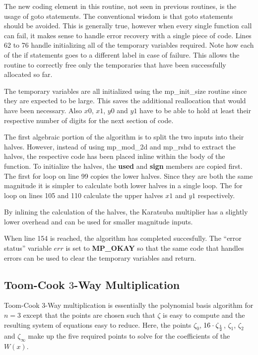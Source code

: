 \documentclass[b5paper]{book}
\begin{document}
The new coding element in this routine, not  seen in previous routines, is the usage of goto statements.  The conventional
wisdom is that goto statements should be avoided.  This is generally true, however when every single function call can fail, it makes sense
to handle error recovery with a single piece of code.  Lines 62 to 76 handle initializing all of the temporary variables 
required.  Note how each of the if statements goes to a different label in case of failure.  This allows the routine to correctly free only
the temporaries that have been successfully allocated so far.

The temporary variables are all initialized using the mp\_init\_size routine since they are expected to be large.  This saves the 
additional reallocation that would have been necessary.  Also $x0$, $x1$, $y0$ and $y1$ have to be able to hold at least their respective
number of digits for the next section of code.

The first algebraic portion of the algorithm is to split the two inputs into their halves.  However, instead of using mp\_mod\_2d and mp\_rshd
to extract the halves, the respective code has been placed inline within the body of the function.  To initialize the halves, the \textbf{used} and 
\textbf{sign} members are copied first.  The first for loop on line 99 copies the lower halves.  Since they are both the same magnitude it 
is simpler to calculate both lower halves in a single loop.  The for loop on lines 105 and 110 calculate the upper halves $x1$ and 
$y1$ respectively.

By inlining the calculation of the halves, the Karatsuba multiplier has a slightly lower overhead and can be used for smaller magnitude inputs.

When line 154 is reached, the algorithm has completed succesfully.  The ``error status'' variable $err$ is set to \textbf{MP\_OKAY} so that
the same code that handles errors can be used to clear the temporary variables and return.  

\subsection{Toom-Cook $3$-Way Multiplication}
Toom-Cook $3$-Way \cite{TOOM} multiplication is essentially the polynomial basis algorithm for $n = 3$ except that the points  are 
chosen such that $\zeta$ is easy to compute and the resulting system of equations easy to reduce.  Here, the points $\zeta_{0}$, 
$16 \cdot \zeta_{1 \over 2}$, $\zeta_1$, $\zeta_2$ and $\zeta_{\infty}$ make up the five required points to solve for the coefficients 
of the $W(x)$.
\end{document}
